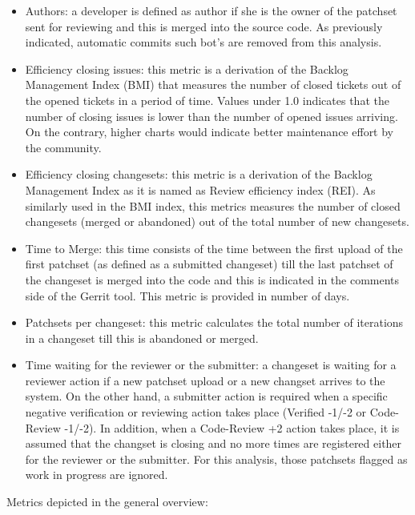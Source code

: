 \documentclass[a4wide,11pt]{report}
\begin{document}
\begin{itemize}
\item Authors: a developer is defined as author if she is the owner of the patchset sent for reviewing and this is 
merged into the source code. As previously indicated, automatic commits such bot's are removed from this analysis.

\item Efficiency closing issues: this metric is a derivation of the Backlog Management Index (BMI) that measures the number
of closed tickets out of the opened tickets in a period of time. Values under 1.0 indicates that the number of closing
issues is lower than the number of opened issues arriving. On the contrary, higher charts would indicate better
maintenance effort by the community.

\item Efficiency closing changesets: this metric is a derivation of the Backlog Management Index as it is named as
Review efficiency index (REI). As similarly used in the BMI index, this metrics measures the number of closed changesets
(merged or abandoned) out of the total number of new changesets.

\item Time to Merge: this time consists of the time between the first upload of the first patchset (as defined
as a submitted changeset) till the last patchset of the changeset is merged into the code and this is indicated in the 
comments side of the Gerrit tool. This metric is provided in number of days.

\item Patchsets per changeset: this metric calculates the total number of iterations in a changeset till this is abandoned
or merged.

\item Time waiting for the reviewer or the submitter: a changeset is waiting for a reviewer action if a new patchset upload
or a new changset arrives to the system. On the other hand, a submitter action is required when a specific negative verification
or reviewing action takes place (Verified -1/-2 or Code-Review -1/-2). In addition, when a Code-Review +2 action takes place,
it is assumed that the changset is closing and no more times are registered either for the reviewer or the submitter.
For this analysis, those patchsets flagged as work in progress are ignored.

\end{itemize}

Metrics depicted in the general overview:
\end{document}
